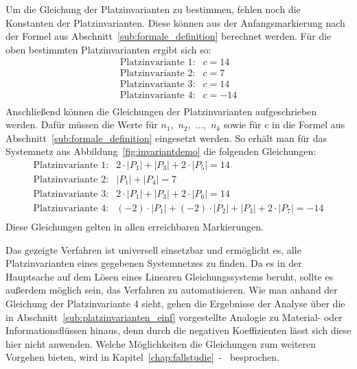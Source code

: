 		Um die Gleichung der Platzinvarianten zu bestimmen, fehlen noch die Konstanten der Platzinvarianten. Diese können aus der Anfangsmarkierung nach der Formel aus Abschnitt~\ref{sub:formale_definition} berechnet werden. Für die oben bestimmten Platzinvarianten ergibt sich so:
		$$
		\begin{matrix}
			\text{Platzinvariante 1}: & c = 14 	\\
			\text{Platzinvariante 2}: & c = 7 	\\
			\text{Platzinvariante 3}: & c = 14 	\\
			\text{Platzinvariante 4}: & c = -14 \\
		\end{matrix}
		$$
		Anschließend können die Gleichungen der Platzinvarianten aufgeschrieben werden. Dafür müssen die Werte für $n_1$,~$n_2$,~...,~$n_k$ sowie für c in die Formel aus Abschnitt~\ref{sub:formale_definition} eingesetzt werden. So erhält man für das Systemnetz aus Abbildung~\ref{fig:invariantdemo} die folgenden Gleichungen:
		$$
		\begin{matrix}
			\text{Platzinvariante 1}: & 2 \cdot |P_1| + |P_3| + 2 \cdot |P_5| = 14 \\
			\text{Platzinvariante 2}: & |P_1| + |P_4| = 7 \\
			\text{Platzinvariante 3}: & 2 \cdot |P_1| + |P_3| + 2 \cdot |P_6| = 14 \\
			\text{Platzinvariante 4}: & (-2) \cdot |P_1| + (-2) \cdot |P_2| + |P_3| + 2 \cdot |P_7|= -14 \\
		\end{matrix}
		$$
		Diese Gleichungen gelten in allen erreichbaren Markierungen.

		Das gezeigte Verfahren ist universell einsetzbar und ermöglicht es, alle Platzinvarianten eines gegebenen Systemnetzes zu finden. Da es in der Hauptsache auf dem Lösen eines Linearen Gleichungssystems beruht, sollte es außerdem möglich sein, das Verfahren zu automatisieren. Wie man anhand der Gleichung der Platzinvariante 4 sieht, gehen die Ergebnisse der Analyse über die in Abschnitt~\ref{sub:platzinvarianten_einf} vorgestellte Analogie zu Material- oder Informationsflüssen hinaus, denn durch die negativen Koeffizienten lässt sich diese hier nicht anwenden. Welche Möglichkeiten die Gleichungen zum weiteren Vorgehen bieten, wird in Kapitel~\ref{chap:fallstudie}~-~ besprochen. 
